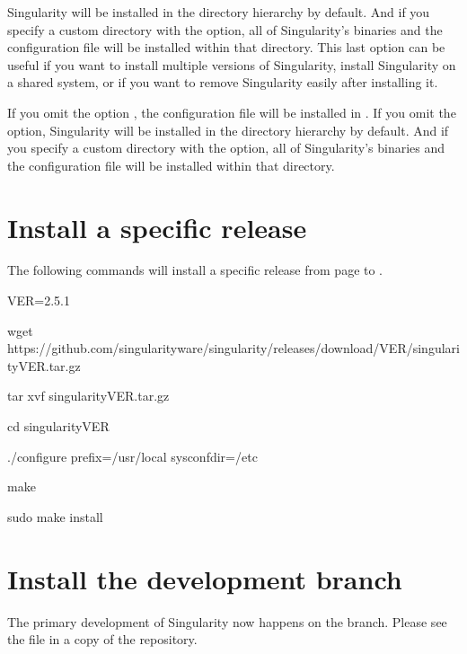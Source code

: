 \documentclass[letterpaper,10pt,english]{sphinxmanual}
\begin{document}
Singularity will be installed in the  directory hierarchy by default.
And if you specify a custom directory with the  option, all of
Singularity’s binaries and the configuration file will be installed within that
directory. This last option can be useful if you want to install multiple versions
of Singularity, install Singularity on a shared system, or if you want to remove
Singularity easily after installing it.

If you omit the  option , the configuration file will be installed in .
If you omit the  option, Singularity will be installed in the  directory
hierarchy by default. And if you specify a custom directory with the 
option, all of Singularity’s binaries and the configuration file will be installed within that directory.


\section{Install a specific release}
\label{\detokenize{installation:install-a-specific-release}}
The following commands will install a specific release from  page to .

%
\begin{sphinxVerbatim}[commandchars=\\\{\}]
\PYGZdl{} VER=2.5.1

\PYGZdl{} wget https://github.com/singularityware/singularity/releases/download/\PYGZdl{}VER/singularity\PYGZhy{}\PYGZdl{}VER.tar.gz

\PYGZdl{} tar xvf singularity\PYGZhy{}\PYGZdl{}VER.tar.gz

\PYGZdl{} cd singularity\PYGZhy{}\PYGZdl{}VER

\PYGZdl{} ./configure \PYGZhy{}\PYGZhy{}prefix=/usr/local \PYGZhy{}\PYGZhy{}sysconfdir=/etc

\PYGZdl{} make

\PYGZdl{} sudo make install
\end{sphinxVerbatim}


\section{Install the development branch}
\label{\detokenize{installation:install-the-development-branch}}
The primary development of Singularity now happens on the  branch.
Please see the  file in a copy of the repository.
\end{document}
